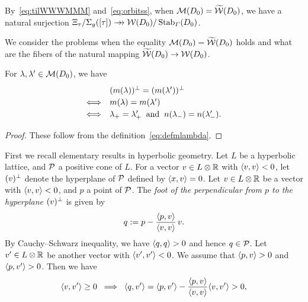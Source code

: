 \documentclass{amsart} %
\begin{document}
%
\begin{remark}\label{rem:orbitss}
By~\eqref{eq:tilWWWMMM} and~\eqref{eq:orbitss},
when $ \mathord{\mathcal{M}}(D_0)=\widetilde{\mathord{\mathcal{W}}}(D_0)$, 
we have 
a natural surjection 
$ \Xi_{\tau}/\Sigma_{g}([\tau]) \mathrel{\rightarrow\!\!\!\!\rightarrow} \mathord{\mathcal{W}}(D_0)/\operatorname{Stab}_{\varGamma}(D_0)$.
\end{remark}
%
We consider the problems when 
the equality $\mathord{\mathcal{M}}(D_0)=\widetilde{\mathord{\mathcal{W}}} (D_0)$ holds and 
what are the fibers of the natural mapping $\widetilde{\mathord{\mathcal{W}}} (D_0)\to \mathord{\mathcal{W}}(D_0)$.
%
%
%
\begin{lemma}\label{lem:mmequal}
For $\lambda, \lambda^{\prime}\in \mathord{\mathcal{M}}(D_0)$, we have 
\[
\renewcommand{\arraystretch}{1.2}
\begin{array}{cl}
&(m(\lambda))\sperp=(m(\lambda\sprime))\sperp\\
\Longleftrightarrow & m(\lambda)=m(\lambda\sprime) \\
\Longleftrightarrow & \lambdaplus=\lambdaplus\sprime\;\;\textrm{and}\;\; 
n(\lambdaminus)=n(\lambdaminus\sprime).
\end{array}
\]
\end{lemma}
%
\begin{proof}
These follow from the definition~\eqref{eq:defmlambda}.
\end{proof}
%
%
First we recall elementary results in hyperbolic geometry.
Let $L$ be a hyperbolic lattice, and $\mathord{\mathcal{P}}$ a positive cone of $L$.
For a vector $v\in L\otimes\mathord{\mathbb{R}}$ with $\langle v, v \rangle<0$,
let $(v)^{\perp}$ denote the hyperplane of $\mathord{\mathcal{P}}$ defined by $\langle x, v \rangle=0$.
Let $v\in L\otimes\mathord{\mathbb{R}}$ be a vector with $\langle v, v \rangle<0$, and 
$p$ a point of $\mathord{\mathcal{P}}$.
The \emph{foot of the perpendicular from $p$ to the hyperplane $(v)^{\perp}$ }
is given by
\[
q:=p-\frac{\langle p, v \rangle}{\langle v,v \rangle}\, v.
\]
By Cauchy--Schwarz inequality,
we have $\langle q, q \rangle>0$
and hence 
$q\in \mathord{\mathcal{P}}$.
Let $v^{\prime}\in L\otimes\mathord{\mathbb{R}}$ be another vector with $\langle v^{\prime}, v^{\prime} \rangle<0$.
We assume that $\langle p, v \rangle>0$ and $\langle p, v^{\prime} \rangle>0$.
Then we have
%
\begin{equation}\label{eq:ifvvsprime}
\langle v, v^{\prime} \rangle\ge 0 \;\;\Longrightarrow \;\; \langle q, v^{\prime} \rangle=
\langle p, v^{\prime} \rangle-\dfrac{\langle p, v \rangle}{\langle v,v \rangle} \langle v, v^{\prime} \rangle>0,
\end{equation}
\end{document}
